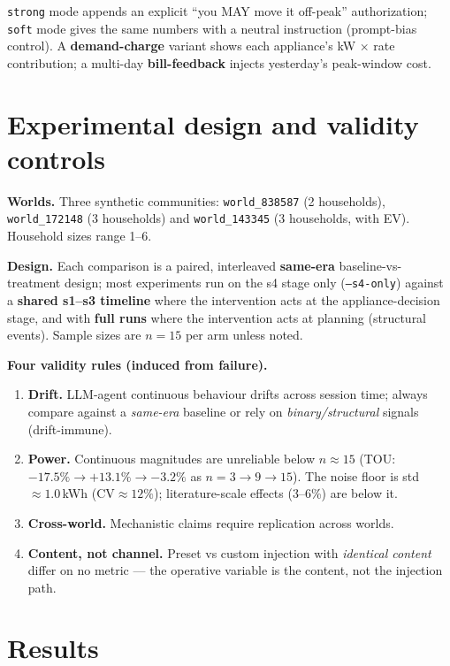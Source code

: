 \documentclass[11pt]{article}
\begin{document}
\noindent
\texttt{strong} mode appends an explicit ``you MAY move it off-peak'' authorization; \texttt{soft} mode
gives the same numbers with a neutral instruction (prompt-bias control). A \textbf{demand-charge} variant
shows each appliance's kW $\times$ rate contribution; a multi-day \textbf{bill-feedback} injects
yesterday's peak-window cost.

\section{Experimental design and validity controls}
\textbf{Worlds.} Three synthetic communities: \texttt{world\_838587} (2 households),
\texttt{world\_172148} (3 households) and \texttt{world\_143345} (3 households, with EV). Household sizes
range 1--6.

\textbf{Design.} Each comparison is a paired, interleaved \textbf{same-era} baseline-vs-treatment design;
most experiments run on the s4 stage only (\texttt{--s4-only}) against a \textbf{shared s1--s3 timeline}
where the intervention acts at the appliance-decision stage, and with \textbf{full runs} where the
intervention acts at planning (structural events). Sample sizes are $n=15$ per arm unless noted.

\textbf{Four validity rules (induced from failure).}
\begin{enumerate}
\item \textbf{Drift.} LLM-agent continuous behaviour drifts across session time; always compare against a
\emph{same-era} baseline or rely on \emph{binary/structural} signals (drift-immune).
\item \textbf{Power.} Continuous magnitudes are unreliable below $n\approx 15$ (TOU: $-17.5\%\rightarrow
+13.1\%\rightarrow -3.2\%$ as $n=3\rightarrow 9\rightarrow 15$). The noise floor is std $\approx 1.0$\,kWh
($\mathrm{CV}\approx 12\%$); literature-scale effects (3--6\%) are below it.
\item \textbf{Cross-world.} Mechanistic claims require replication across worlds.
\item \textbf{Content, not channel.} Preset vs custom injection with \emph{identical content} differ on no
metric --- the operative variable is the content, not the injection path.
\end{enumerate}

\section{Results}
\end{document}
